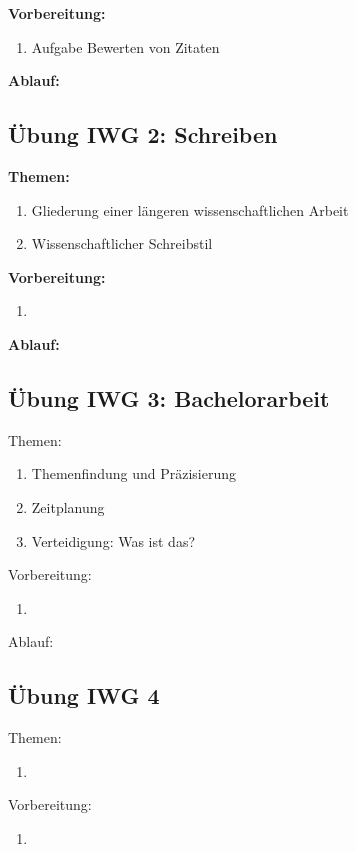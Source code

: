 \textbf{Vorbereitung:}
\begin{enumerate}
\item Aufgabe Bewerten von Zitaten
\end{enumerate}

\textbf{Ablauf:}


\subsection{Übung IWG 2: Schreiben}

\textbf{Themen:}
\begin{enumerate}
\item Gliederung einer längeren wissenschaftlichen Arbeit
\item Wissenschaftlicher Schreibstil
\end{enumerate}

\textbf{Vorbereitung:}
\begin{enumerate}
\item 
\end{enumerate}

\textbf{Ablauf:}


\subsection{Übung IWG 3: Bachelorarbeit}

Themen:
\begin{enumerate}
\item Themenfindung und Präzisierung
\item Zeitplanung
\item Verteidigung: Was ist das?
\end{enumerate}

Vorbereitung:
\begin{enumerate}
\item 
\end{enumerate}

Ablauf:


\subsection{Übung IWG 4}

Themen:
\begin{enumerate}
\item 
\end{enumerate}

Vorbereitung:
\begin{enumerate}
\item 
\end{enumerate}

